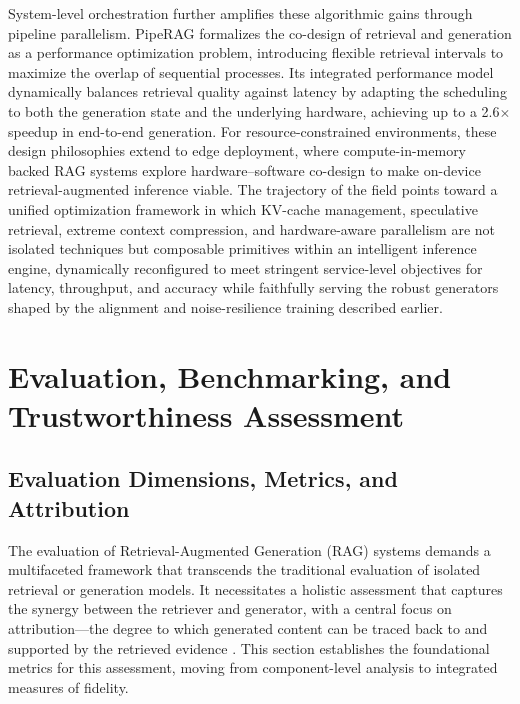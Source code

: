 \documentclass[11pt,a4paper]{article}
\begin{document}
System-level orchestration further amplifies these algorithmic gains through pipeline parallelism. PipeRAG \cite{arxiv:2403.05676v1} formalizes the co-design of retrieval and generation as a performance optimization problem, introducing flexible retrieval intervals to maximize the overlap of sequential processes. Its integrated performance model dynamically balances retrieval quality against latency by adapting the scheduling to both the generation state and the underlying hardware, achieving up to a 2.6$\times$ speedup in end-to-end generation. For resource-constrained environments, these design philosophies extend to edge deployment, where compute-in-memory backed RAG systems explore hardware--software co-design to make on-device retrieval-augmented inference viable. The trajectory of the field points toward a unified optimization framework in which KV-cache management, speculative retrieval, extreme context compression, and hardware-aware parallelism are not isolated techniques but composable primitives within an intelligent inference engine, dynamically reconfigured to meet stringent service-level objectives for latency, throughput, and accuracy while faithfully serving the robust generators shaped by the alignment and noise-resilience training described earlier.


\section{Evaluation, Benchmarking, and Trustworthiness Assessment}



\subsection{Evaluation Dimensions, Metrics, and Attribution}


The evaluation of Retrieval-Augmented Generation (RAG) systems demands a multifaceted framework that transcends the traditional evaluation of isolated retrieval or generation models. It necessitates a holistic assessment that captures the synergy between the retriever and generator, with a central focus on attribution---the degree to which generated content can be traced back to and supported by the retrieved evidence \cite{arxiv:2312.10997v5}. This section establishes the foundational metrics for this assessment, moving from component-level analysis to integrated measures of fidelity.
\end{document}
